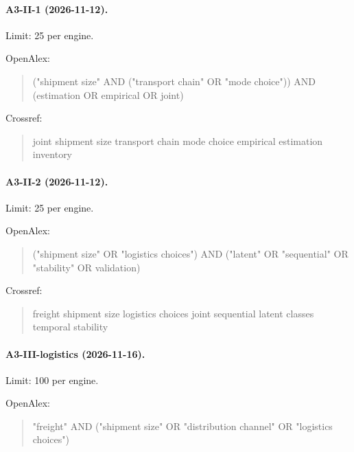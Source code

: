 \paragraph{A3-II-1 (2026-11-12).} Limit: 25 per engine.

\noindent OpenAlex:

\begin{quote}\footnotesize\ttfamily\raggedright

("shipment size" AND ("transport chain" OR "mode choice")) AND (estimation OR empirical OR joint)

\end{quote}

\noindent Crossref:

\begin{quote}\footnotesize\ttfamily\raggedright

joint shipment size transport chain mode choice empirical estimation inventory

\end{quote}

\paragraph{A3-II-2 (2026-11-12).} Limit: 25 per engine.

\noindent OpenAlex:

\begin{quote}\footnotesize\ttfamily\raggedright

("shipment size" OR "logistics choices") AND ("latent" OR "sequential" OR "stability" OR validation)

\end{quote}

\noindent Crossref:

\begin{quote}\footnotesize\ttfamily\raggedright

freight shipment size logistics choices joint sequential latent classes temporal stability

\end{quote}

\paragraph{A3-III-logistics (2026-11-16).} Limit: 100 per engine.

\noindent OpenAlex:

\begin{quote}\footnotesize\ttfamily\raggedright

"freight" AND ("shipment size" OR "distribution channel" OR "logistics choices")

\end{quote}

